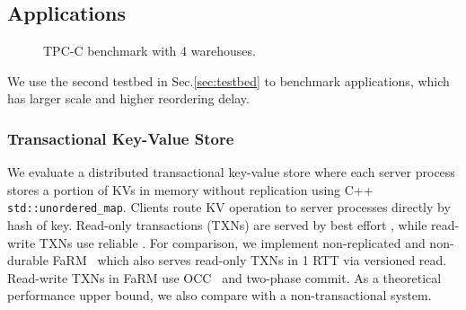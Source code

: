 \subsection{Applications}
\label{sec:application}


\begin{figure}[t]
\centering
	\hspace{0.02\textwidth}
    \hspace{0.02\textwidth}
\vspace{-10pt}
\caption{TPC-C benchmark with 4 warehouses.}
\label{fig:tpc-c}
\vspace{-10pt}
\end{figure}


We use the second testbed in Sec.\ref{sec:testbed} to benchmark applications, which has larger scale and higher reordering delay.

\subsubsection{Transactional Key-Value Store}
\label{subsec:eval-kvs}


We evaluate a distributed transactional key-value store where each server process stores a portion of KVs in memory without replication using C++ \texttt{std::unordered\_map}.
Clients route KV operation to server processes directly by hash of key.
Read-only transactions (TXNs) are served by best effort \sys{}, while read-write TXNs use reliable \sys{}.
For comparison, we implement non-replicated and non-durable FaRM~\cite{dragojevic2014farm} which also serves read-only TXNs in 1 RTT via versioned read. Read-write TXNs in FaRM use OCC~\cite{kung1981optimistic} and two-phase commit.
As a theoretical performance upper bound, we also compare with a non-transactional system.

